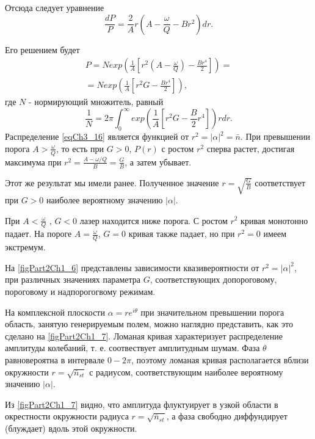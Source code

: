 Отсюда следует уравнение
\begin{equation}
\frac{d P}{P} = 
\frac{2}{A} r \left(A - \frac{\omega}{Q} - B r^2\right)d r. 
\label{eqCh3_15}
\end{equation}

Его решением будет
\begin{eqnarray}
P = N exp \left(\frac{1}{A}
\left[
r^2 \left(A - \frac{\omega}{Q}\right)
 - 
\frac{B r^4}{2}
\right]
\right) = 
\nonumber \\
= 
N exp \left(\frac{1}{A}
\left[
r^2 G
 - 
\frac{B r^4}{2}
\right]
\right),
\label{eqCh3_16}
\end{eqnarray}
где $N$ - нормирующий множитель, равный
\[
\frac{1}{N} = 2 \pi \int_0^{\infty}
exp\left(
\frac{1}{A}\left[
r^2 G - \frac{B}{2}r^4
\right]
\right)
r dr.
\]
Распределение \eqref{eqCh3_16}
является функцией от $r^2 = \left|\alpha\right|^2 = \bar{n}$. При
превышении порога $A > \frac{\omega}{Q}$,  то есть при $G > 0$,
$P\left(r\right)$ с ростом $r^2$ сперва растет, достигая максимума при
$r^2 = \frac{A - \omega/Q}{B} = \frac{G}{B}$, а затем убывает.  

Этот же результат мы имели ранее. Полученное значение $r =
\sqrt{\frac{G}{B}}$ соответствует при $G > 0$ наиболее вероятному
значению $\left|\alpha\right|$.
  
При $A < \frac{\omega}{Q}$ , $G < 0$ лазер находится ниже порога. С
ростом $r^2$ кривая монотонно падает. На пороге $A =
\frac{\omega}{Q}$,  $G = 0$  кривая также падает, но при $r^2 = 0$
имеем экстремум.   



На \autoref{figPart2Ch1_6} представлены зависимости квазивероятности от $r^2 =
\left|\alpha\right|^2$, при различных значениях параметра $G$,
соответствующих допороговому, пороговому и надпорогогвому режимам. 

На комплексной плоскости $\alpha = r e^{i \theta}$ при значительном
превышении порога область, занятую генерируемым полем, можно наглядно
представить, как это сделано на
\autoref{figPart2Ch1_7}. Ломаная кривая характеризует
распределение амплитуды колебаний, т. е. соотвествует амплитудным 
шумам. Фаза $\theta$ равновероятна в интервале  $0 - 2\pi$,
поэтому ломаная кривая располагается вблизи окружности $r =
\sqrt{\bar{n}_{st}}$ с радиусом, соответствующим наиболее вероятному
значению $\left|\alpha\right|$. 



Из \autoref{figPart2Ch1_7} видно, что амплитуда флуктуирует в узкой области в
окрестности окружности радиуса $r = \sqrt{\bar{n}_{st}}$,  а фаза
свободно диффундирует (блуждает) вдоль этой окружности. 

